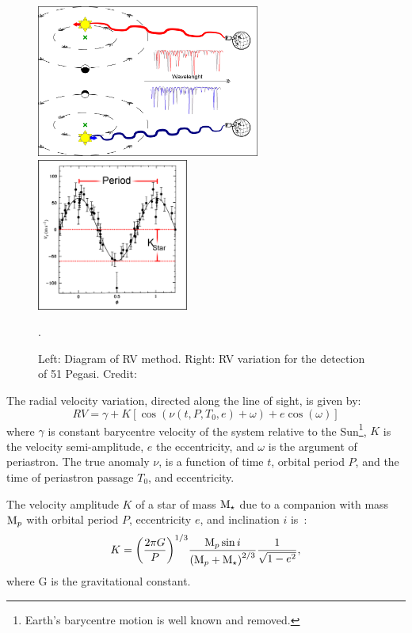 \begin{figure}
    \centering
    \includegraphics[height=5cm]{./figures/introduction/RV_Diagram}
    \includegraphics[height=5cm]{./figures/introduction/PhaseFolded_51Pegb_Mayor_et_al_1995}
    \caption{Left: Diagram of {RV} method.
        Right: {RV} variation for the detection of {51 Pegasi}.
        Credit:~\citet{mayor_jupitermass_1995}}.
    \label{fig:rvdiagram-mayor}
\end{figure}

The radial velocity variation, directed along the line of sight, is given by:
\begin{equation}
\label{eq:rv_equation_intro}
{RV} = \gamma + K [\cos{(\nu(t, P, T_0, e) + \omega)} + e\cos{(\omega)}]
\end{equation}
where $\gamma$ is constant barycentre velocity of the system relative to the Sun\footnote{Earth's barycentre motion is well known and removed.}, \(K\) is the velocity semi-amplitude, \(e\) the eccentricity, and \(\omega\) is the argument of periastron.
The true anomaly \(\nu\), is a function of time \(t\), orbital period \(P\), and the time of periastron passage \(T_0\), and eccentricity.

The velocity amplitude $K$ of a star of mass $\textrm{M}_{\star}$ due to a companion with mass $\textrm{M}_{p}$ with orbital period $P$, eccentricity $e$, and inclination $i$ is~\citep[e.g.][]{cumming_lick_1999}:
\begin{equation}
    K = {\left(\frac{2\pi G}{P}\right)}^{1/3} \frac{\textrm{M}_{p}{} \sin{i}}{{(\textrm{M}_{p}{} + \textrm{M}_{\star})}^{2/3}} \frac{1}{\sqrt{1-{e}^{2}}}, \label{eq:k_amplitude}
\end{equation}
where G is the gravitational constant.

